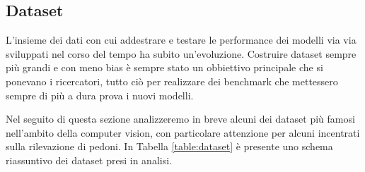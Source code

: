 \subsection{Dataset}
L'insieme dei dati con cui addestrare e testare le performance dei modelli via via sviluppati nel corso del tempo ha subito un'evoluzione. Costruire dataset sempre più grandi e con meno bias è sempre stato un obbiettivo principale che si ponevano i ricercatori, tutto ciò per realizzare dei benchmark che mettessero sempre di più a dura prova i nuovi modelli. 

Nel seguito di questa sezione analizzeremo in breve alcuni dei dataset più famosi nell'ambito della computer vision, con particolare attenzione per alcuni incentrati sulla rilevazione di pedoni. In Tabella \ref{table:dataset} è presente uno schema riassuntivo dei dataset presi in analisi.


